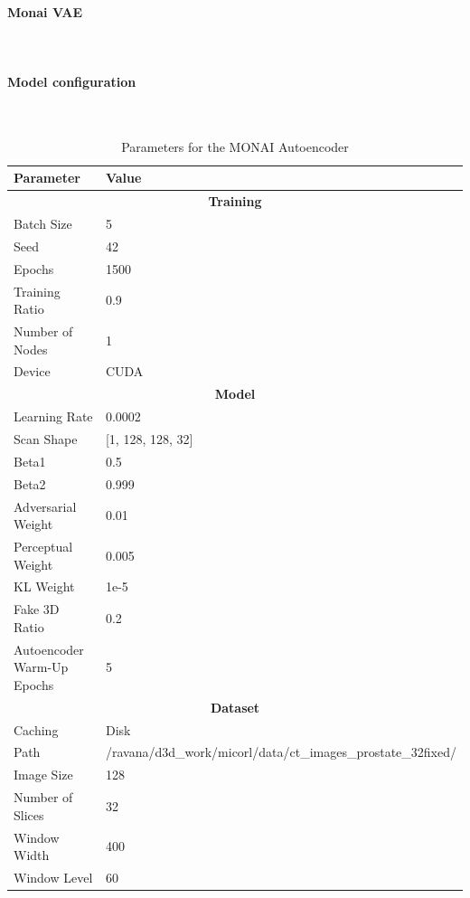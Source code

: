 \paragraph{Monai VAE}\mbox{}\\

\paragraph{Model configuration}\mbox{}\\
\begin{table}[h!]
\centering
\begin{tabular}{|l|l|}
\hline
\textbf{Parameter} & \textbf{Value} \\
\hline
\multicolumn{2}{|c|}{\textbf{Training}} \\
\hline
Batch Size & 5 \\
\hline
Seed & 42 \\
\hline
Epochs & 1500 \\
\hline
Training Ratio & 0.9 \\
\hline
Number of Nodes & 1 \\
\hline
Device & CUDA \\
\hline
\multicolumn{2}{|c|}{\textbf{Model}} \\
\hline
Learning Rate & 0.0002 \\
\hline
Scan Shape & [1, 128, 128, 32] \\
\hline
Beta1 & 0.5 \\
\hline
Beta2 & 0.999 \\
\hline
Adversarial Weight & 0.01 \\
\hline
Perceptual Weight & 0.005 \\
\hline
KL Weight & 1e-5 \\
\hline
Fake 3D Ratio & 0.2 \\
\hline
Autoencoder Warm-Up Epochs & 5 \\
\hline
\multicolumn{2}{|c|}{\textbf{Dataset}} \\
\hline
Caching & Disk \\
\hline
Path & /ravana/d3d\_work/micorl/data/ct\_images\_prostate\_32fixed/ \\
\hline
Image Size & 128 \\
\hline
Number of Slices & 32 \\
\hline
Window Width & 400 \\
\hline
Window Level & 60 \\
\hline
\end{tabular}
\caption{Parameters for the MONAI Autoencoder}
\label{table:monai_autoencoder_params}
\end{table}


